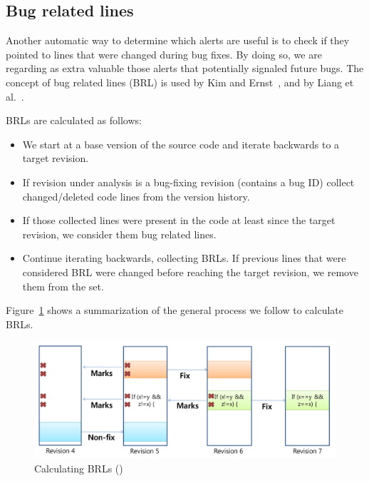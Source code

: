 \subsection{Bug related lines}

Another automatic way to determine which alerts are useful is to check if they pointed to lines that were changed during bug fixes. By doing so, we are regarding as extra valuable those alerts that potentially signaled future bugs. The concept of bug related lines (BRL) is used by Kim and Ernst~\cite{which_warnings}, and by Liang et al.~\cite{automatic_training_set}.

BRLs are calculated as follows:
\begin{itemize}
    \item We start at a base version of the source code and iterate backwards to a target revision. 
    \item If revision under analysis is a bug-fixing revision (contains a bug ID) collect changed/deleted code lines from the version history.
    \item If those collected lines were present in the code at least since the target revision, we consider them bug related lines.
    \item Continue iterating backwards, collecting BRLs. If previous lines that were considered BRL were changed before reaching the target revision, we remove them from the set. 
\end{itemize}

Figure~\ref{fig:calculating-brls} shows a summarization of the general process we follow to calculate BRLs.


\begin{figure}[H]
    \centering
    \includegraphics[scale=0.3]{./src/brl_example.png}
    \caption{Calculating BRLs (\cite{which_warnings})}
    \label{fig:calculating-brls} %
\end{figure}

